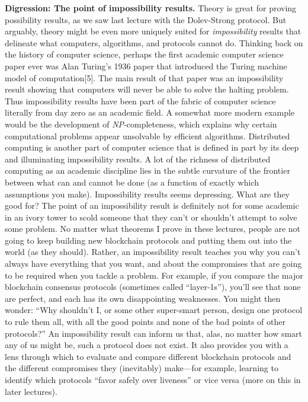\textbf{Digression: The point of impossibility results.} Theory is great for proving possibility
results, as we saw last lecture with the Dolev-Strong protocol. But arguably, theory might be
even more uniquely suited for \textit{impossibility} results that delineate what computers, algorithms,
and protocols cannot do.
Thinking back on the history of computer science, perhaps the first academic computer
science paper ever was Alan Turing’s 1936 paper that introduced the Turing machine model
of computation[5]. The main result of that paper was an impossibility result showing that
computers will never be able to solve the halting problem. Thus impossibility results have
been part of the fabric of computer science literally from day zero as an academic field.
A somewhat more modern example would be the development of \textit{NP}-completeness, which
explains why certain computational problems appear unsolvable by efficient algorithms. Distributed computing is another part of computer science that is defined in part by its deep
and illuminating impossibility results. A lot of the richness of distributed computing as an
academic discipline lies in the subtle curvature of the frontier between what can and cannot
be done (as a function of exactly which assumptions you make).
Impossibility results seems depressing. What are they good for? The point of an impossibility result is definitely not for some academic in an ivory tower to scold someone that
they can’t or shouldn't attempt to solve some problem. No matter what theorems I prove in
these lectures, people are not going to keep building new blockchain protocols and putting
them out into the world (as they should). Rather, an impossibility result teaches you why
you can’t always have everything that you want, and about the compromises that are going
to be required when you tackle a problem.
For example, if you compare the major blockchain consensus protocols (sometimes called
“layer-1s”), you’ll see that none are perfect, and each has its own disappointing weaknesses.
You might then wonder: “Why shouldn't I, or some other super-smart person, design one
protocol to rule them all, with all the good points and none of the bad points of other
protocols?” An impossibility result can inform us that, alas, no matter how smart any
of us might be, such a protocol does not exist. It also provides you with a lens through
which to evaluate and compare different blockchain protocols and the different compromises
they (inevitably) make—for example, learning to identify which protocols “favor safely over
liveness” or vice versa (more on this in later lectures).
